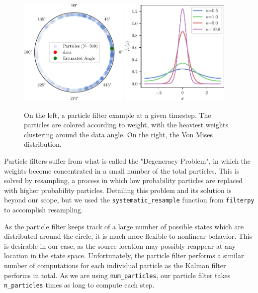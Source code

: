 \documentclass[11pt]{amsart}
\begin{document}
\begin{figure}[htp]
    \centering
    \includegraphics[width=0.47\textwidth]{actual_paper_graphs/particle_filter_example.pdf}\hfill
    \includegraphics[width=0.47\textwidth]{actual_paper_graphs/von_mises_pdf.pdf}\hfill
    \caption{On the left, a particle filter example at a given timestep. The particles are colored according to weight, with the heaviest weights clustering around the data angle. On the right, the Von Mises distribution.}
    \label{fig:particle_filter_stuff}
\end{figure}

Particle filters suffer from what is called the "Degeneracy Problem", in which the weights become concentrated in a small number of the total particles. This is solved by resampling, a process in which low probability particles are replaced 
with higher probability particles. Detailing this problem and its solution is beyond our scope, but we used the \lstinline{systematic_resample} function from \lstinline{filterpy} to accomplish resampling.

As the particle filter keeps track of a large number of possible states which are distributed around the circle, it is much more flexible to nonlinear behavior. This is desirable in our case, as the source location may possibly reappear at any 
location in the state space. Unfortunately, the particle filter performs a similar number of computations for each individual particle as the Kalman filter performs in total. As we are using \lstinline{num_particles}, our particle filter takes \lstinline{n_particles} 
times as long to compute each step.
\end{document}
